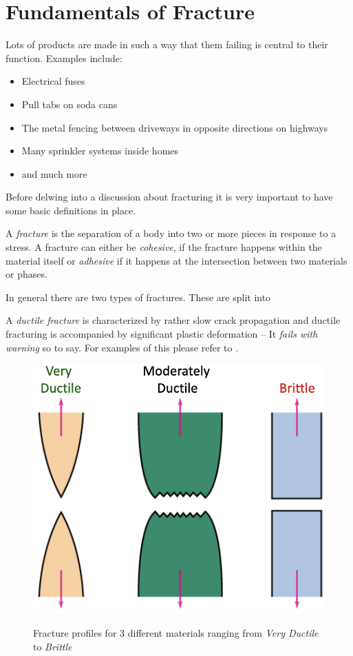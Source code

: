 
\section{Fundamentals of Fracture}
\begin{dis}
  Lots of products are made in such a way that them failing is central to their function. Examples include:
  \begin{itemize}
    \item Electrical fuses
    \item Pull tabs on soda cans
    \item The metal fencing between driveways in opposite directions on highways
    \item Many sprinkler systems inside homes
    \item and much more
  \end{itemize}
\end{dis}
Before delwing into a discussion about fracturing it is very important to have some basic definitions in place.
\begin{definition}[Fracture]
  A \textit{fracture} is the separation of a body into two or more pieces in response to a stress. A fracture can either be \textit{cohesive}, if the fracture happens within the material itself or \textit{adhesive} if it happens at the intersection between two materials or phases.
\end{definition}
In general there are two types of fractures. These are split into
\begin{definition}
  A \textit{ductile fracture} is characterized by rather slow crack propagation and ductile fracturing is accompanied by significant plastic deformation -- It \textit{fails with warning} so to say. For examples of this please refer to \textbf{}.
\end{definition}
\begin{figure} [ht]
  \centering
  \caption{Fracture profiles for 3 different materials ranging from \textit{Very Ductile} to \textit{Brittle}}
  \includegraphics[width=0.25\linewidth]{./figures/f9_1.png}
  \label{fig:f9_1}
\end{figure}
